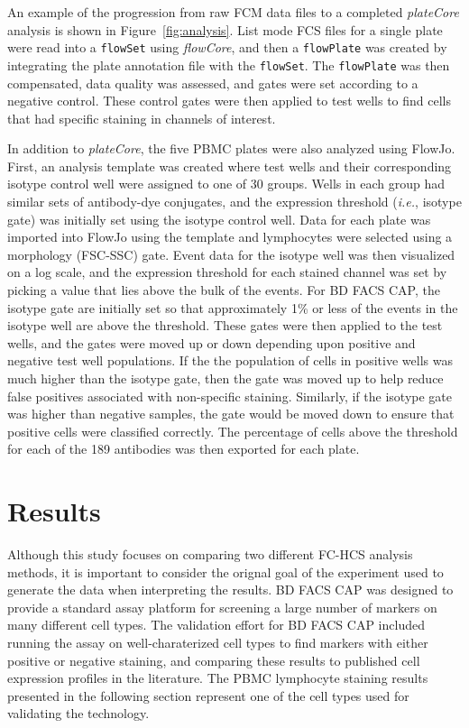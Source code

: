\documentclass[12pt]{article}
\newcommand{\Robject}[1]{{\texttt{#1}}}
\newcommand{\Rpackage}[1]{{\textit{#1}}}
\begin{document}
An example of the progression from raw FCM data files to a completed
\Rpackage{plateCore} analysis is shown in Figure~\ref{fig:analysis}. List mode
FCS files for a single plate were read into a \Robject{flowSet} using
\Rpackage{flowCore}, and then a \Robject{flowPlate} was created by integrating
the plate annotation file with the \Robject{flowSet}. The \Robject{flowPlate}
was then compensated, data quality was assessed, and gates were set according
to a negative control. These control gates were then applied to test wells to
find cells that had specific staining in channels of interest.

In addition to \Rpackage{plateCore}, the five PBMC plates were also analyzed
using FlowJo. First, an analysis template was created where test wells and
their corresponding isotype control well were assigned to one of 30 groups.
Wells in each group had similar sets of antibody-dye conjugates, and
the expression threshold (\emph{i.e.}, isotype gate) was initially set using
the isotype control well. Data for each plate was imported into FlowJo using
the template and lymphocytes were selected using a morphology (FSC-SSC) gate.
Event data for the isotype well was then visualized on a log scale, and the
expression threshold for each stained channel was set by picking a value that
lies above the bulk of the events. For BD FACS CAP, the isotype gate are
initially set so that approximately 1\% or less of the events in the isotype
well are above the threshold. These gates were then applied to the test wells,
and the gates were moved up or down depending upon positive and negative test
well populations. If the the population of cells in positive wells was much
higher than the isotype gate, then the gate was moved up to help reduce false
positives associated with non-specific staining.  Similarly, if the isotype
gate was higher than negative samples, the gate would be moved down to ensure
that positive cells were classified correctly. The percentage of cells above
the threshold for each of the 189 antibodies was then exported for each plate.

\section*{Results}

Although this study focuses on comparing two different FC-HCS analysis methods,
it is important to consider the orignal goal of the experiment used to generate
the data when interpreting the results. BD FACS CAP was designed to provide a
standard assay platform for screening a large number of markers on many
different cell types. The validation effort for BD FACS CAP included running
the assay on well-charaterized cell types to find markers with either positive
or negative staining, and comparing these results to published cell expression
profiles in the literature. The PBMC lymphocyte staining results presented in
the following section represent one of the cell types used for validating the
technology.
\end{document}
